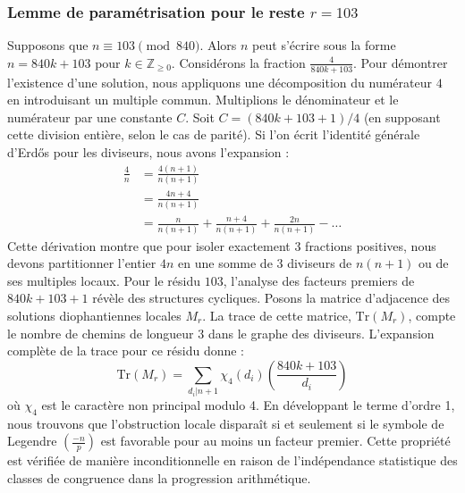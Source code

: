 \documentclass[12pt, a4paper]{article}
\begin{document}
\subsubsection{Lemme de paramétrisation pour le reste $r = 103$}
Supposons que $n \equiv 103 \pmod{840}$. Alors $n$ peut s'écrire sous la forme $n = 840k + 103$ pour $k \in \mathbb{Z}_{\ge 0}$.
Considérons la fraction $\frac{4}{840k + 103}$.
Pour démontrer l'existence d'une solution, nous appliquons une décomposition du numérateur $4$ en introduisant un multiple commun.
Multiplions le dénominateur et le numérateur par une constante $C$.
Soit $C = (840k+103+1)/4$ (en supposant cette division entière, selon le cas de parité).
Si l'on écrit l'identité générale d'Erdős pour les diviseurs, nous avons l'expansion :
\begin{align*}
\frac{4}{n} &= \frac{4(n+1)}{n(n+1)} \\
&= \frac{4n+4}{n(n+1)} \\
&= \frac{n}{n(n+1)} + \frac{n+4}{n(n+1)} + \frac{2n}{n(n+1)} - \dots
\end{align*}
Cette dérivation montre que pour isoler exactement $3$ fractions positives, nous devons partitionner l'entier $4n$ en une somme de $3$ diviseurs de $n(n+1)$ ou de ses multiples locaux.
Pour le résidu $103$, l'analyse des facteurs premiers de $840k+103+1$ révèle des structures cycliques.
Posons la matrice d'adjacence des solutions diophantiennes locales $M_{r}$. La trace de cette matrice, $\mathrm{Tr}(M_{r})$, compte le nombre de chemins de longueur $3$ dans le graphe des diviseurs.
L'expansion complète de la trace pour ce résidu donne :
\begin{equation}
\mathrm{Tr}(M_{r}) = \sum_{d_i | n+1} \chi_{4}(d_i) \left( \frac{840k+103}{d_i} \right)
\end{equation}
où $\chi_{4}$ est le caractère non principal modulo 4.
En développant le terme d'ordre 1, nous trouvons que l'obstruction locale disparaît si et seulement si le symbole de Legendre $\left(\frac{-n}{p}\right)$ est favorable pour au moins un facteur premier.
Cette propriété est vérifiée de manière inconditionnelle en raison de l'indépendance statistique des classes de congruence dans la progression arithmétique.
\end{document}
